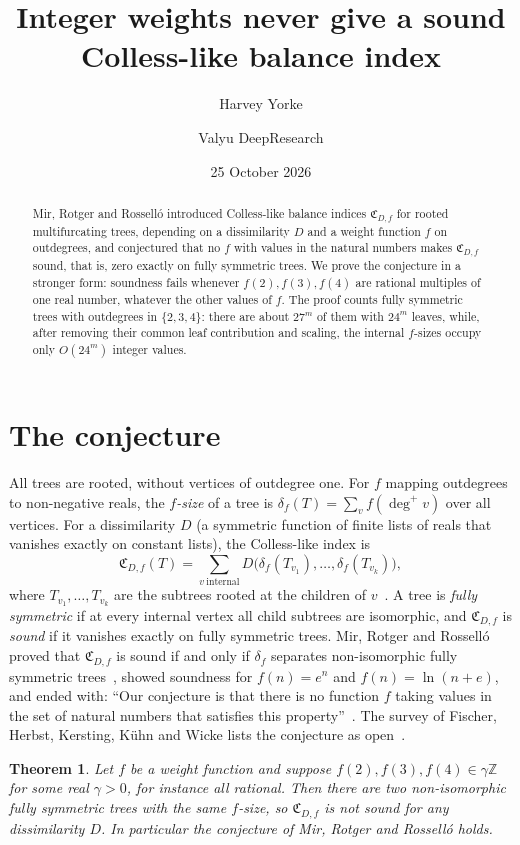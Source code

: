 \documentclass[11pt]{amsart}
\title{Integer weights never give a sound Colless-like balance index}
\author{Harvey Yorke}
\author{Valyu DeepResearch}
\date{25 October 2026}
\newtheorem{theorem}{Theorem}[section]
\theoremstyle{remark}
\begin{document}
\raggedbottom
\begin{abstract}
Mir, Rotger and Rossell\'o introduced Colless-like balance indices $\mathfrak C_{D,f}$ for rooted multifurcating trees, depending on a dissimilarity $D$ and a weight function $f$ on outdegrees, and conjectured that no $f$ with values in the natural numbers makes $\mathfrak C_{D,f}$ sound, that is, zero exactly on fully symmetric trees. We prove the conjecture in a stronger form: soundness fails whenever $f(2),f(3),f(4)$ are rational multiples of one real number, whatever the other values of $f$. The proof counts fully symmetric trees with outdegrees in $\{2,3,4\}$: there are about $27^m$ of them with $24^m$ leaves, while, after removing their common leaf contribution and scaling, the internal $f$-sizes occupy only $O(24^m)$ integer values.
\end{abstract}
\maketitle

\section{The conjecture}

All trees are rooted, without vertices of outdegree one. For $f$ mapping outdegrees to non-negative reals, the \emph{$f$-size} of a tree is $\delta_f(T)=\sum_{v}f(\deg^+v)$ over all vertices. For a dissimilarity $D$ (a symmetric function of finite lists of reals that vanishes exactly on constant lists), the Colless-like index is
\[
\mathfrak C_{D,f}(T)=\sum_{v\ \text{internal}} D\bigl(\delta_f(T_{v_1}),\dots,\delta_f(T_{v_k})\bigr),
\]
where $T_{v_1},\dots,T_{v_k}$ are the subtrees rooted at the children of $v$~\cite{MRR2018}. A tree is \emph{fully symmetric} if at every internal vertex all child subtrees are isomorphic, and $\mathfrak C_{D,f}$ is \emph{sound} if it vanishes exactly on fully symmetric trees. Mir, Rotger and Rossell\'o proved that $\mathfrak C_{D,f}$ is sound if and only if $\delta_f$ separates non-isomorphic fully symmetric trees~\cite[Lemma~10]{MRR2018}, showed soundness for $f(n)=e^n$ and $f(n)=\ln(n+e)$, and ended with: ``Our conjecture is that there is no function $f$ taking values in the set of natural numbers that satisfies this property''~\cite{MRR2018}. The survey of Fischer, Herbst, Kersting, K\"uhn and Wicke lists the conjecture as open~\cite[Sec.~9.7]{FHKKW2023}.

\begin{theorem}\label{thm:main}
Let $f$ be a weight function and suppose $f(2),f(3),f(4)\in\gamma\mathbb Z$ for some real $\gamma>0$, for instance all rational. Then there are two non-isomorphic fully symmetric trees with the same $f$-size, so $\mathfrak C_{D,f}$ is not sound for any dissimilarity $D$. In particular the conjecture of Mir, Rotger and Rossell\'o holds.
\end{theorem}
\end{document}
